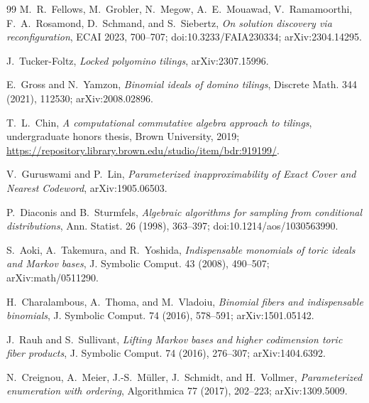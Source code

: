 \begin{thebibliography}{99}
M.~R.~Fellows, M.~Grobler, N.~Megow, A.~E.~Mouawad,
V.~Ramamoorthi, F.~A.~Rosamond, D.~Schmand, and S.~Siebertz,
\emph{On solution discovery via reconfiguration},
ECAI 2023, 700--707;
doi:10.3233/FAIA230334; arXiv:2304.14295.

J.~Tucker-Foltz,
\emph{Locked polyomino tilings},
arXiv:2307.15996.

E.~Gross and N.~Yamzon,
\emph{Binomial ideals of domino tilings},
Discrete Math. 344 (2021), 112530;
arXiv:2008.02896.

T.~L.~Chin,
\emph{A computational commutative algebra approach to tilings},
undergraduate honors thesis, Brown University, 2019;
\url{https://repository.library.brown.edu/studio/item/bdr:919199/}.

V.~Guruswami and P.~Lin,
\emph{Parameterized inapproximability of Exact Cover and Nearest Codeword},
arXiv:1905.06503.

P.~Diaconis and B.~Sturmfels,
\emph{Algebraic algorithms for sampling from conditional distributions},
Ann. Statist. 26 (1998), 363--397;
doi:10.1214/aos/1030563990.

S.~Aoki, A.~Takemura, and R.~Yoshida,
\emph{Indispensable monomials of toric ideals and Markov bases},
J. Symbolic Comput. 43 (2008), 490--507;
arXiv:math/0511290.

H.~Charalambous, A.~Thoma, and M.~Vladoiu,
\emph{Binomial fibers and indispensable binomials},
J. Symbolic Comput. 74 (2016), 578--591;
arXiv:1501.05142.

J.~Rauh and S.~Sullivant,
\emph{Lifting Markov bases and higher codimension toric fiber products},
J. Symbolic Comput. 74 (2016), 276--307;
arXiv:1404.6392.

N.~Creignou, A.~Meier, J.-S.~M\"uller, J.~Schmidt, and H.~Vollmer,
\emph{Parameterized enumeration with ordering},
Algorithmica 77 (2017), 202--223;
arXiv:1309.5009.

\end{thebibliography}
